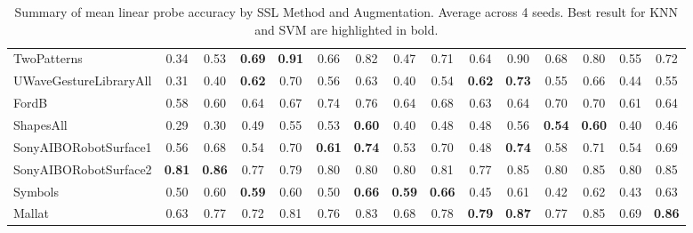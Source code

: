 \documentclass[../../thesis.tex]{subfiles}
\begin{document}
\begin{table}[H]
\begin{adjustbox}{width=\textwidth}
\begin{tabular}{lcc|cc|cc|cc|cc|cc|cc}
        TwoPatterns             & 0.34 & 0.53 & \textbf{0.69} &\textbf{ 0.91} & 0.66 & 0.82 & 0.47 & 0.71 & 0.64 & 0.90 & 0.68 & 0.80 & 0.55 & 0.72 \\
        UWaveGestureLibraryAll  & 0.31 & 0.40 & \textbf{0.62} & 0.70 & 0.56 & 0.63 & 0.40 & 0.54 & \textbf{0.62} & \textbf{0.73} & 0.55 & 0.66 & 0.44 & 0.55 \\
        FordB                   & 0.58 & 0.60 & 0.64 & 0.67 & 0.74 & 0.76 & 0.64 & 0.68 & 0.63 & 0.64 & 0.70 & 0.70 & 0.61 & 0.64\\
        ShapesAll               & 0.29 & 0.30 & 0.49 & 0.55 & 0.53 & \textbf{0.60} & 0.40 & 0.48 & 0.48 & 0.56 &\textbf{ 0.54} & \textbf{0.60} & 0.40 & 0.46 \\
        SonyAIBORobotSurface1   & 0.56 & 0.68 & 0.54 & 0.70 & \textbf{0.61} & \textbf{0.74} & 0.53 & 0.70 & 0.48 & \textbf{0.74} & 0.58 & 0.71 & 0.54 & 0.69 \\
        SonyAIBORobotSurface2   & \textbf{0.81} & \textbf{0.86} & 0.77 & 0.79 & 0.80 & 0.80 & 0.80 & 0.81 & 0.77 & 0.85 & 0.80 & 0.85 & 0.80 & 0.85  \\
        Symbols                 & 0.50 & 0.60 & \textbf{0.59} & 0.60 & 0.50 & \textbf{0.66} & \textbf{0.59} & \textbf{0.66} & 0.45 & 0.61 & 0.42 & 0.62 & 0.43 & 0.63 \\
        Mallat                  & 0.63 & 0.77 & 0.72 & 0.81 & 0.76 & 0.83 & 0.68 & 0.78 & \textbf{0.79} & \textbf{0.87} & 0.77 & 0.85 & 0.69 & \textbf{0.86} \\
        \bottomrule
    \end{tabular}
    \end{adjustbox}
    
    \caption{Summary of mean linear probe accuracy by SSL Method and Augmentation. Average across 4 seeds. Best result for KNN and SVM are highlighted in bold.}
\end{table}
\end{document}
